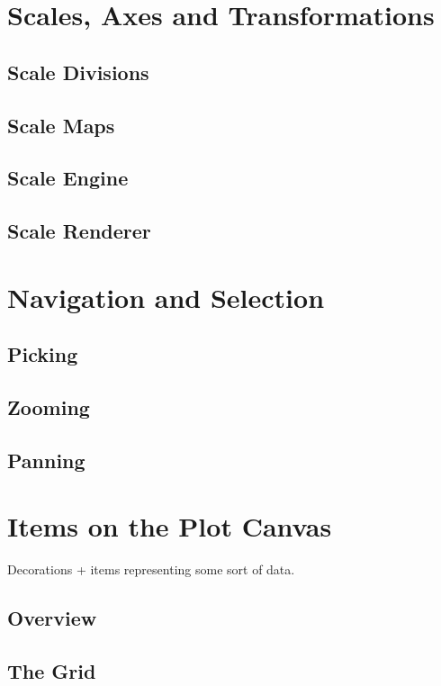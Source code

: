 \documentclass[12pt,a4paper]{book}
\begin{document}
\chapter{Scales, Axes and Transformations}

\section{Scale Divisions}

\section{Scale Maps}

\section{Scale Engine}

\section{Scale Renderer}

\chapter{Navigation and Selection}

\section{Picking}
\section{Zooming}
\section{Panning}

\chapter{Items on the Plot Canvas}

Decorations + items representing some sort of data.

\section{Overview}
\section{The Grid}
\end{document}
